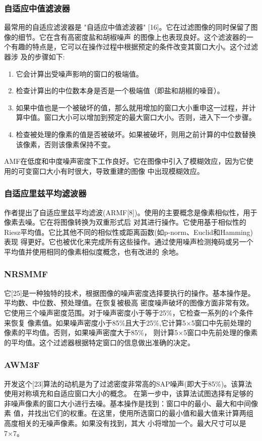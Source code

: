 \documentclass[12pt]{article} %
\begin{document}
\subsubsection{自适应中值滤波器}
最常用的自适应滤波器是 "自适应中值滤波器" [16]。它在过滤图像的同时保留了图像的细节。它在含有高密度盐和胡椒噪声
的图像上也表现良好。这个滤波器的一个有趣的特点是，它可以在操作过程中根据预定的条件改变其窗口大小。这个过滤器涉
及的步骤如下:
\begin{enumerate}
    \item 它会计算出受噪声影响的窗口的极端值。
    \item 检查计算出的中位数本身是否是一个极端值（即盐和胡椒的噪音）。
    \item 如果中值也是一个被破坏的值，那么就用增加的窗口大小重申这一过程，并计算中值。窗口大小可以增加到预定的最大窗口大小。否则，进入下一个步骤。
    \item 检查被处理的像素的值是否被破坏。如果被破坏，则用之前计算的中位数替换该像素，否则该像素保持不变。
\end{enumerate}
AMF在低度和中度噪声密度下工作良好。它在图像中引入了模糊效应，因为它使用的可变窗口大小有时很大，导致重建的图像
中出现模糊效应。

\subsubsection{自适应里兹平均滤波器}
作者提出了自适应里兹平均滤波(ARMF[8])。使用的主要概念是像素相似性，用于像素去噪。它在将图像转换为双重形式后
对其进行操作。它使用基于相似性的Riesz平均值。它比其他不同的相似性或距离函数(如p-norm、Euclid和Hamming)表现
得更好。它也被优化来完成所有这些操作。通过使用噪声检测掩码或另一个平均值并使用相同的像素相似度概念，也有改进的
余地。

\subsubsection{NRSMMF}
它[25]是一种独特的技术，根据图像的噪声密度选择要执行的操作。基本操作是。平均数、中位数、预处理值。在恢复被极高
密度噪声破坏的图像方面非常有效。它使用三个噪声密度范围。对于噪声密度小于等于25\%，它检查一系列的4个条件来恢复
像素值。如果噪声密度小于85\%且大于25\%,它计算5×5窗口中先前处理的像素的平均值。否则，如果噪声密度大于85\%，
则计算5×5窗口中先前处理的像素的平均值。这个过滤器根据特定窗口的信息做出准确的决定。

\subsubsection{AWM3F}
开发这个[23]算法的动机是为了过滤密度非常高的SAP噪声(即大于85\%)。该算法使用对称填充和自适应窗口大小的概念。
在第一步中，该算法试图选择有足够的非噪声像素的窗口大小进行去噪。基本操作是找到：窗口中的最小、最大和中间像素
值，并找出它们的权重。在这里，使用所选窗口的最小值和最大值来计算两组高度相关的无噪声像素。如果没有找到，其大
小将增加一个。最大尺寸可以是7×7。
\end{document}
